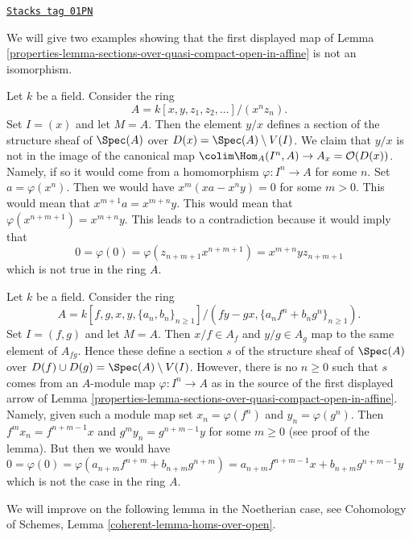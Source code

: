 \begin{example}
\label{properties-example-does-not-work-in-general}
\href{https://stacks.math.columbia.edu/tag/01PN}{\texttt{Stacks tag 01PN}}

We will give two examples showing that the first displayed map of
Lemma \ref{properties-lemma-sections-over-quasi-compact-open-in-affine}
is not an isomorphism.

\medskip\noindent
Let $k$ be a field. Consider the ring
$$
A = k[x, y, z_1, z_2, \ldots]/(x^nz_n).
$$
Set $I = (x)$ and let $M = A$. Then the element $y/x$ defines a section of
the structure sheaf of $\Spec(A)$ over $D(x) = \Spec(A) \setminus V(I)$.
We claim that $y/x$ is not in the image of the canonical map
$\colim \Hom_A(I^n, A) \to A_x = \mathcal{O}(D(x))$. Namely, if so it
would come from a homomorphism $\varphi : I^n \to A$ for some $n$.
Set $a = \varphi(x^n)$. Then we would have $x^m(xa - x^ny) = 0$ for some
$m > 0$. This would mean that $x^{m + 1}a = x^{m + n}y$. This would mean that
$\varphi(x^{n + m + 1}) = x^{m + n}y$. This leads to a contradiction
because it would imply that
$$
0 = \varphi(0) = \varphi(z_{n + m + 1} x^{n + m + 1}) =
x^{m + n}y z_{n + m + 1}
$$
which is not true in the ring $A$.

\medskip\noindent
Let $k$ be a field. Consider the ring
$$
A = k[f, g, x, y, \{a_n, b_n\}_{n \geq 1}]/
(fy - gx, \{a_nf^n + b_ng^n\}_{n \geq 1}).
$$
Set $I = (f, g)$ and let $M = A$. Then $x/f \in A_f$ and $y/g \in A_g$
map to the same element of $A_{fg}$. Hence these define a section $s$
of the structure sheaf of $\Spec(A)$ over
$D(f) \cup D(g) = \Spec(A) \setminus V(I)$. However, there is no
$n \geq 0$ such that $s$ comes from an $A$-module map
$\varphi : I^n \to A$ as in the source of the first displayed arrow
of Lemma \ref{properties-lemma-sections-over-quasi-compact-open-in-affine}.
Namely, given such a module map set
$x_n = \varphi(f^n)$ and $y_n = \varphi(g^n)$.
Then $f^mx_n = f^{n + m - 1}x$ and
$g^my_n = g^{n + m - 1}y$ for some $m \geq 0$ (see proof
of the lemma). But then we would have
$0 = \varphi(0) =
\varphi(a_{n + m}f^{n + m} + b_{n + m}g^{n + m}) =
a_{n + m}f^{n + m - 1}x + b_{n + m}g^{n + m - 1}y$ which is not the case
in the ring $A$.
\end{example}

We will improve on the following lemma in the Noetherian case, see
Cohomology of Schemes, Lemma \ref{coherent-lemma-homs-over-open}.

